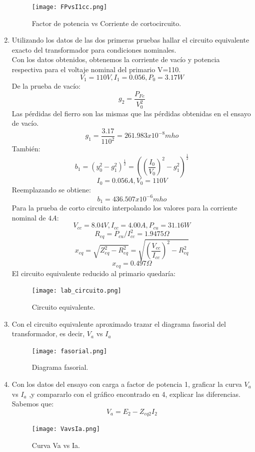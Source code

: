 \begin{enumerate}
    \begin{figure}[H]
    \centering
    \texttt{[image: FPvsI1cc.png]}
    \captionsetup{labelformat=empty}
    \caption{Factor de potencia vs Corriente de cortocircuito.}
    \end{figure}
    
    \item Utilizando los datos de las dos primeras pruebas hallar el circuito equivalente exacto del transformador para condiciones nominales.\\
    Con los datos obtenidos, obtenemos la corriente de vacío y potencia respectiva para el voltaje nominal del primario V=110.
    \[V_{1}=110V ,I_{1}=0.056, P_{0}=3.17W\]
    De la prueba de vacío:
    \[g_{2}=\frac{P_{Fe}}{V_{0}^2}\]
    Las pérdidas del fierro son las mismas que las pérdidas obtenidas en el ensayo de vacío.
    \[g_{1}=\frac{3.17}{110^2}=261.983x10^{-8} mho\]
    También:
    \[b_{1}=\left(y_{0}^2-g_{1}^2\right)^{\frac{1}{2}}=\left(\left(\frac{I_{0}}{V_{0}}\right)^2-g_{1}^2\right)^{\frac{1}{2}}\]
    \[I_{0}=0.056A,V_{0}=110V\]
    Reemplazando se obtiene:
    \[b_{1}=436.507x10^{−6}mho\]
    Para la prueba de corto circuito interpolando los valores para la corriente nominal de $4A$:
    \[V_{cc}=8.04V,I_{cc}=4.00A,P_{cu}=31.16W\]
    \[R_{eq}=P_{cu}/I_{cc}^2=1.9475\Omega\]
    \[x_{eq}=\sqrt{Z_{eq}^2−R_{eq}^2}=\sqrt{\left(\frac{V_{cc}}{I_{cc}}\right)^2−R_{eq}^2}\]
    \[x_{eq}=0.497\Omega\]
    El circuito equivalente reducido al primario quedaría:
    \begin{figure}[H]
    \centering
    \texttt{[image: lab\_circuito.png]}
    \captionsetup{labelformat=empty}
    \caption{\label{pi_} Circuito equivalente.}
    \end{figure}
    
    \item Con el circuito equivalente aproximado trazar el diagrama fasorial del transformador, es decir, $V_{a}$ vs $I_{a}$
    \begin{figure}[H]
    \centering
    \texttt{[image: fasorial.png]}
    \captionsetup{labelformat=empty}
    \caption{\label{pi__} Diagrama fasorial.}
    \end{figure}
    
    \item Con los datos del ensayo con carga a factor de potencia 1, graficar la curva $V_{a}$ vs $I_{a}$ ,y compararlo con el gráfico encontrado en 4, explicar las diferencias.
    Sabemos que:
    \[V_{a}=E_{2}−Z_{eq2}I_{2}\]
    \begin{figure}[H]
    \centering
    \texttt{[image: VavsIa.png]}
    \captionsetup{labelformat=empty}
    \caption{\label{pi___} Curva Va vs Ia.}
    \end{figure}
    

\end{enumerate}
